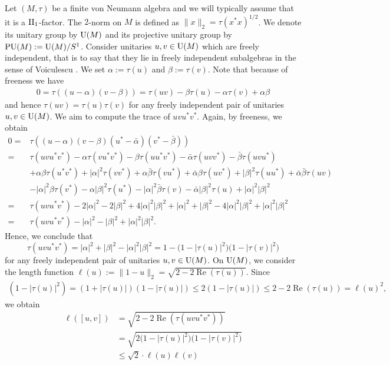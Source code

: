 \documentclass[pdftex]{sigma}
\numberwithin{equation}{section}
\begin{document}
Let $(M,\tau)$ be a finite von Neumann algebra and we will typically assume that it is a ${\rm II}_1$-factor. The $2$-norm on $M$ is defined as $\|x\|_2 = \tau(x^*x)^{1/2}$. We denote its unitary group by ${\rm U}(M)$ and its projective unitary group by ${\rm PU}(M):={\rm U}(M)/S^1$. Consider unitaries $u,v \in {\rm U}(M)$ which are freely independent, that is to say that they lie in freely independent subalgebras in the sense of Voiculescu \cite{MR1217253}. We set $\alpha := \tau(u)$ and $\beta := \tau(v)$. Note that because of freeness we have
\begin{gather*}
0 = \tau((u-\alpha)(v-\beta)) = \tau(uv) - \beta \tau(u) - \alpha \tau(v) + \alpha \beta
\end{gather*}
and hence $\tau(uv) = \tau(u)\tau(v)$ for any freely independent pair of unitaries $u,v \in {\rm U}(M)$. We aim to compute the trace of $uvu^*v^*$. Again, by freeness, we obtain
\begin{align*}
0 ={}& \tau((u-\alpha)(v-\beta)(u^* - \bar \alpha)(v^* - \bar \beta))
\\
={}& \tau(uvu^*v^*) - \alpha \tau(vu^*v^*) - \beta \tau(uu^*v^*) - \bar \alpha \tau(uvv^*) - \bar \beta \tau(uvu^*)
\\
& + \alpha \beta \tau(u^*v^*) + |\alpha|^2 \tau(vv^*) + \alpha \bar \beta \tau(vu^*) + \bar \alpha \beta \tau(uv^*) + |\beta|^2 \tau(uu^*) + \bar \alpha \bar \beta \tau(uv)
\\
& - |\alpha|^2 \beta \tau(v^*) - \alpha |\beta|^2 \tau(u^*) - |\alpha|^2 \bar \beta \tau(v) - \bar \alpha |\beta|^2 \tau(u) + |\alpha|^2|\beta|^2
\\
={}& \tau(uvu^*v^*) - 2|\alpha|^2 - 2 |\beta|^2 + 4 |\alpha|^2 |\beta|^2 + |\alpha|^2 + |\beta|^2 - 4 |\alpha|^2 |\beta|^2 + |\alpha|^2 |\beta|^2
\\
={}& \tau(uvu^*v^*) - |\alpha|^2 - |\beta|^2 + |\alpha|^2 |\beta|^2.
\end{align*}
Hence, we conclude that
\[
\tau(uvu^*v^*) = |\alpha|^2 + |\beta|^2 - |\alpha|^2 |\beta|^2 = 1 - \big(1-|\tau(u)|^2\big)\big(1-|\tau(v)|^2\big)
\] for any freely independent pair of unitaries $u,v \in {\rm U}(M)$.
On ${\rm U}(M)$, we consider the length function $\ell(u):= \|1-u\|_2 = \sqrt{2-2 \operatorname{Re}(\tau(u))}$.
Since
\begin{gather*}
(1-|\tau(u)|^2) = (1+ |\tau(u)|)(1-|\tau(u)|) \leq 2 (1-|\tau(u)|) \leq 2 - 2\operatorname{Re}(\tau(u)) = \ell(u)^2,
\end{gather*}
we obtain
\begin{align*}
\ell([u,v]) &= \sqrt{2-2 \operatorname{Re}(\tau(uvu^*v^*))} \\
&= \sqrt{2\big(1-|\tau(u)|^2\big)\big(1- |\tau(v)|^2\big)} \\
&\leq\sqrt{2} \cdot \ell(u) \ell(v)
\end{align*}
\end{document}
